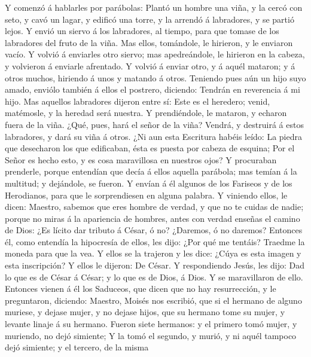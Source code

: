  Y comenzó á hablarles por parábolas: Plantó un hombre una
viña, y la cercó con seto, y cavó un lagar, y edificó una torre, y la
arrendó á labradores, y se partió lejos.  Y envió un siervo
á los labradores, al tiempo, para que tomase de los labradores del fruto
de la viña.  Mas ellos, tomándole, le hirieron, y le
enviaron vacío.  Y volvió á enviarles otro siervo; mas
apedreándole, le hirieron en la cabeza, y volvieron á enviarle
afrentado.  Y volvió á enviar otro, y á aquél mataron; y á
otros muchos, hiriendo á unos y matando á otros.  Teniendo
pues aún un hijo suyo amado, enviólo también á ellos el postrero,
diciendo: Tendrán en reverencia á mi hijo.  Mas aquellos
labradores dijeron entre sí: Este es el heredero; venid, matémosle, y la
heredad será nuestra.  Y prendiéndole, le mataron, y echaron
fuera de la viña.  ¿Qué, pues, hará el señor de la viña?
Vendrá, y destruirá á estos labradores, y dará su viña á otros.
 ¿Ni aun esta Escritura habéis leído: La piedra que
desecharon los que edificaban, ésta es puesta por cabeza de esquina;
 Por el Señor es hecho esto, y es cosa maravillosa en
nuestros ojos?  Y procuraban prenderle, porque entendían
que decía á ellos aquella parábola; mas temían á la multitud; y
dejándole, se fueron.  Y envían á él algunos de los
Fariseos y de los Herodianos, para que le sorprendiesen en alguna
palabra.  Y viniendo ellos, le dicen: Maestro, sabemos que
eres hombre de verdad, y que no te cuidas de nadie; porque no miras á la
apariencia de hombres, antes con verdad enseñas el camino de Dios: ¿Es
lícito dar tributo á César, ó no? ¿Daremos, ó no daremos? 
Entonces él, como entendía la hipocresía de ellos, les dijo: ¿Por qué me
tentáis? Traedme la moneda para que la vea.  Y ellos se la
trajeron y les dice: ¿Cúya es esta imagen y esta inscripción? Y ellos le
dijeron: De César.  Y respondiendo Jesús, les dijo: Dad lo
que es de César á César; y lo que es de Dios, á Dios. Y se maravillaron
de ello.  Entonces vienen á él los Saduceos, que dicen que
no hay resurrección, y le preguntaron, diciendo:  Maestro,
Moisés nos escribió, que si el hermano de alguno muriese, y dejase
mujer, y no dejase hijos, que su hermano tome su mujer, y levante linaje
á su hermano.  Fueron siete hermanos: y el primero tomó
mujer, y muriendo, no dejó simiente;  Y la tomó el segundo,
y murió, y ni aquél tampoco dejó simiente; y el tercero, de la misma
